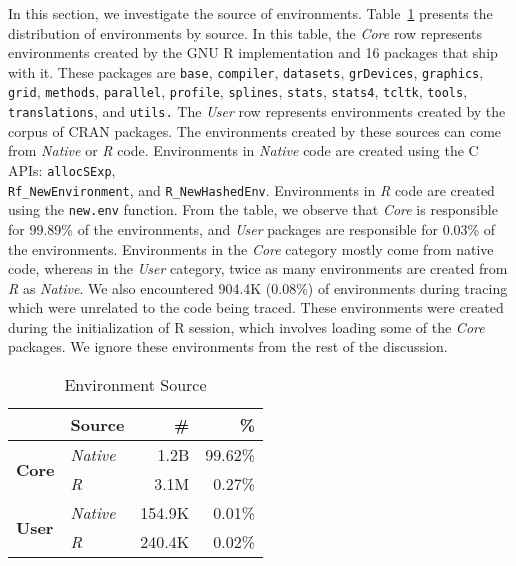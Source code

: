 \documentclass[10pt,review,sigplan,anonymous=true,authorversion=true,nonacm=true]{acmart}
\newcommand{\code}[1]{\lstinline |#1|\xspace}
\newcommand{\newEnv}{\code{new.env}}
\begin{document}
In this section, we investigate the source of environments.
Table~\ref{table:env_source} presents the distribution of environments by
source. In this table, the \emph{Core} row represents environments created by
the GNU R implementation and 16 packages that ship with it. These packages are
\code{base}, \code{compiler}, \code{datasets}, \code{grDevices},
\code{graphics}, \code{grid}, \code{methods}, \code{parallel}, \code{profile},
\code{splines}, \code{stats}, \code{stats4}, \code{tcltk}, \code{tools},
\code{translations}, and \code{utils.} The \emph{User} row represents
environments created by the corpus of CRAN packages. The environments created by
these sources can come from \emph{Native} or \emph{R} code. Environments in
\emph{Native} code are created using the C APIs: \code{allocSExp},
\\\code{Rf_NewEnvironment}, and \code{R_NewHashedEnv}. Environments in \emph{R}
code are created using the \newEnv function. From the table, we observe that
\emph{Core} is responsible for 99.89\% of the environments, and \emph{User}
packages are responsible for 0.03\% of the environments. Environments in the
\emph{Core} category mostly come from native code, whereas in the \emph{User}
category, twice as many environments are created from \emph{R} as \emph{Native}.
We also encountered 904.4K (0.08\%) of environments during tracing which were
unrelated to the code being traced. These environments were created during the
initialization of R session, which involves loading some of the \emph{Core}
packages. We ignore these environments from the rest of the discussion.

\begin{table}[!h]
  \small
  \centering
  \caption{Environment Source}\label{table:env_source}
  \vspace{-3mm}
  \begin{tabular}{llrr}
    \toprule
    &\textbf{Source}&\textbf{\#}&\textbf{\%}\\
    \midrule
    \multirow{2}{*}{\textbf{Core}}  & \multicolumn{1}{l}{\emph{Native}} & \multicolumn{1}{r}{1.2B} & \multicolumn{1}{r}{99.62\%}\\
                                    & \multicolumn{1}{l}{\emph{R}}      & \multicolumn{1}{r}{3.1M} & \multicolumn{1}{r}{0.27\%}\\
    \midrule
    \multirow{2}{*}{\textbf{User}}  & \multicolumn{1}{l}{\emph{Native}} & \multicolumn{1}{r}{154.9K} & \multicolumn{1}{r}{0.01\%}\\
                                    & \multicolumn{1}{l}{\emph{R}}      & \multicolumn{1}{r}{240.4K} & \multicolumn{1}{r}{0.02\%}\\
    \bottomrule
  \end{tabular}
\end{table}
\end{document}
